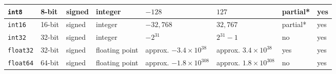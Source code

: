 \documentclass{bmcart}
\begin{document}
\begin{backmatter}
\begin{table}[h!]
\begin{tabular}{| l | l | l | p{0.4in} | p{0.8in} | p{0.8in} | l | l |}
      \texttt{int8}        & 8-bit              & signed              & integer         & $-128$                  & $127$                  & partial*            & yes              \\ \hline
      \texttt{int16}       & 16-bit             & signed              & integer         & $-32,768$               & $32,767$               & partial*            & yes              \\ \hline
      \texttt{int32}       & 32-bit             & signed              & integer         & $-2^{31}$               & $2^{31} - 1$           & no                  & yes              \\ \hline
      \texttt{float32}     & 32-bit             & signed              & floating point  & \parbox[t]{0.8in}{
                                                                                          approx.\\
                                                                                          $-3.4 \times 10^{38}$
                                                                                          }                       & \parbox[t]{0.8in}{
                                                                                                                    approx.\\
                                                                                                                    $3.4 \times 10^{38}$
                                                                                                                    }                      & yes                 & yes              \\ \hline
      \texttt{float64}     & 64-bit             & signed              & floating point  & \parbox[t]{0.8in}{
                                                                                          approx.\\
                                                                                          $-1.8 \times 10^{308}$
                                                                                          }                       & \parbox[t]{0.8in}{
                                                                                                                    approx.\\
                                                                                                                    $1.8 \times 10^{308}$
                                                                                                                    }                      & no                  & yes              \\ \hline

\end{tabular}
\end{table}
\end{backmatter}
\end{document}
